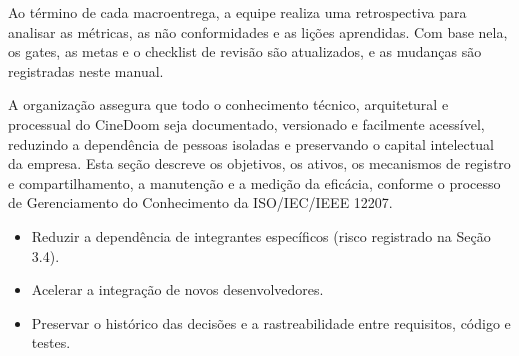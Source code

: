 
Ao término de cada macroentrega, a equipe realiza uma retrospectiva para analisar as métricas, as não conformidades e as lições aprendidas. Com base nela, os gates, as metas e o checklist de revisão são atualizados, e as mudanças são registradas neste manual.


A organização assegura que todo o conhecimento técnico, arquitetural e processual do CineDoom seja documentado, versionado e facilmente acessível, reduzindo a dependência de pessoas isoladas e preservando o capital intelectual da empresa. Esta seção descreve os objetivos, os ativos, os mecanismos de registro e compartilhamento, a manutenção e a medição da eficácia, conforme o processo de Gerenciamento do Conhecimento da ISO/IEC/IEEE 12207.


\begin{itemize}
\item Reduzir a dependência de integrantes específicos (risco registrado na Seção 3.4).
\item Acelerar a integração de novos desenvolvedores.
\item Preservar o histórico das decisões e a rastreabilidade entre requisitos, código e testes.
\end{itemize}



